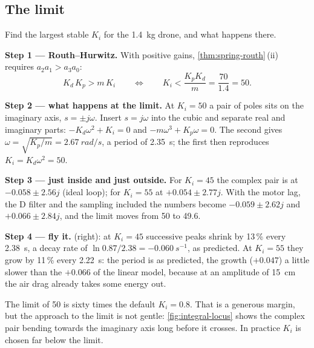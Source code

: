\subsection{The limit}

\begin{example}
\label{ex:integral-limit}
Find the largest stable $K_i$ for the \SI{1.4}{kg} drone, and what happens there.

\textbf{Step 1 — Routh–Hurwitz.} With positive gains, \cref{thm:spring-routh}\,(ii) requires $a_2a_1 > a_3a_0$:
\begin{equation}\label{eq:integral-routh}
  K_d\,K_p > m\,K_i \qquad\Longleftrightarrow\qquad K_i < \frac{K_p K_d}{m} = \frac{70}{1.4} = 50 .
\end{equation}

\textbf{Step 2 — what happens at the limit.} At $K_i = 50$ a pair of poles sits on the imaginary axis, $s = \pm j\omega$. Insert $s = j\omega$ into the cubic and separate real and imaginary parts: $-K_d\omega^2 + K_i = 0$ and $-m\omega^3 + K_p\omega = 0$. The second gives $\omega = \sqrt{K_p/m} = \SI{2.67}{rad/s}$, a period of \SI{2.35}{s}; the first then reproduces $K_i = K_d\omega^2 = 50$.

\textbf{Step 3 — just inside and just outside.} For $K_i = 45$ the complex pair is at $-0.058 \pm 2.56j$ (ideal loop); for $K_i = 55$ at $+0.054 \pm 2.77j$. With the motor lag, the D filter and the sampling included the numbers become $-0.059 \pm 2.62j$ and $+0.066 \pm 2.84j$, and the limit moves from 50 to 49.6.

\textbf{Step 4 — fly it.}  (right): at $K_i = 45$ successive peaks shrink by 13\,\% every \SI{2.38}{s}, a decay rate of $\ln 0.87/2.38 = \SI{-0.060}{s^{-1}}$, as predicted. At $K_i = 55$ they grow by 11\,\% every \SI{2.22}{s}: the period is as predicted, the growth ($+0.047$) a little slower than the $+0.066$ of the linear model, because at an amplitude of \SI{15}{cm} the air drag already takes some energy out.
\end{example}

The limit of 50 is sixty times the default $K_i = 0.8$. That is a generous margin, but the approach to the limit is not gentle: \cref{fig:integral-locus} shows the complex pair bending towards the imaginary axis long before it crosses. In practice $K_i$ is chosen far below the limit.

